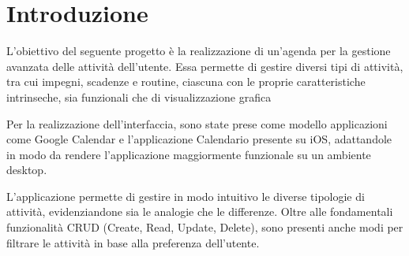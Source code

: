 \section{Introduzione}

L'obiettivo del seguente progetto è la realizzazione di
un'agenda per la gestione avanzata delle attività dell'utente.
Essa permette di gestire diversi tipi di attività, tra cui
impegni, scadenze e routine, ciascuna con le proprie
caratteristiche intrinseche, sia funzionali che di
visualizzazione grafica

Per la realizzazione dell'interfaccia, sono state prese come
modello applicazioni come Google Calendar e l'applicazione
Calendario presente su iOS, adattandole in modo da rendere
l'applicazione maggiormente funzionale su un ambiente desktop.

L'applicazione permette di gestire in modo intuitivo le diverse
tipologie di attività, evidenziandone sia le analogie che le
differenze. Oltre alle fondamentali funzionalità CRUD
(Create, Read, Update, Delete), sono presenti anche modi per
filtrare le attività in base alla preferenza dell'utente.